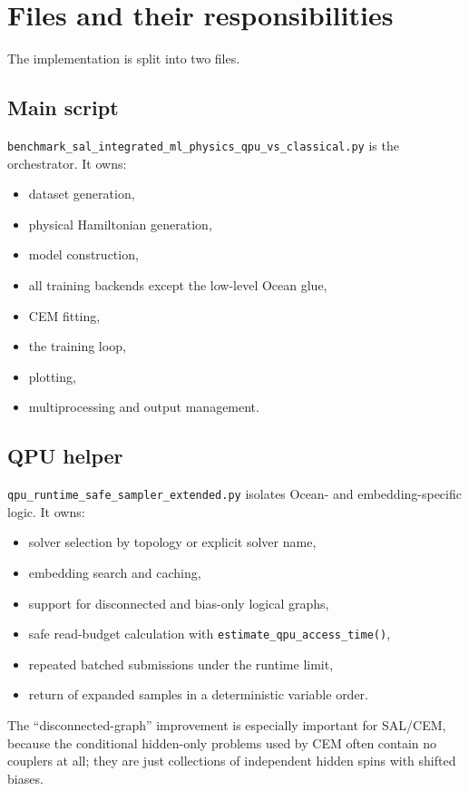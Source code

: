 \documentclass[11pt]{article}
\begin{document}
\section{Files and their responsibilities}

The implementation is split into two files.

\subsection{Main script}

\texttt{benchmark\_sal\_integrated\_ml\_physics\_qpu\_vs\_classical.py} is the
orchestrator. It owns:
\begin{itemize}
  \item dataset generation,
  \item physical Hamiltonian generation,
  \item model construction,
  \item all training backends except the low-level Ocean glue,
  \item CEM fitting,
  \item the training loop,
  \item plotting,
  \item multiprocessing and output management.
\end{itemize}

\subsection{QPU helper}

\texttt{qpu\_runtime\_safe\_sampler\_extended.py} isolates Ocean- and
embedding-specific logic. It owns:
\begin{itemize}
  \item solver selection by topology or explicit solver name,
  \item embedding search and caching,
  \item support for disconnected and bias-only logical graphs,
  \item safe read-budget calculation with
  \texttt{estimate\_qpu\_access\_time()},
  \item repeated batched submissions under the runtime limit,
  \item return of expanded samples in a deterministic variable order.
\end{itemize}

The ``disconnected-graph'' improvement is especially important for SAL/CEM,
because the conditional hidden-only problems used by CEM often contain no
couplers at all; they are just collections of independent hidden spins with
shifted biases.
\end{document}
